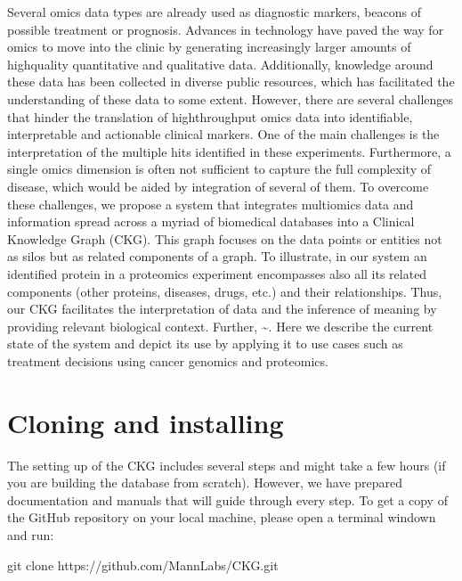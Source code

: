 \documentclass[letterpaper,10pt,english]{sphinxmanual}
\begin{document}
Several omics data types are already used as diagnostic markers, beacons of possible treatment or prognosis. Advances in technology have paved the way for omics to move into the clinic by generating increasingly larger amounts of high\sphinxhyphen{}quality quantitative and qualitative data.  Additionally, knowledge around these data has been collected in diverse public resources, which has facilitated the understanding of these data to some extent. However, there are several challenges that hinder the translation of high\sphinxhyphen{}throughput omics data into identifiable, interpretable and actionable clinical markers. One of the main challenges is the interpretation of the multiple hits identified in these experiments. Furthermore, a single omics dimension is often not sufficient to capture the full complexity of disease, which would be aided by integration of several of them. To overcome these challenges, we propose a system that integrates multi\sphinxhyphen{}omics data and information spread across a myriad of biomedical databases into a Clinical Knowledge Graph (CKG).  This graph focuses on the data points or entities not as silos but as related components of a graph. To illustrate, in our system an identified protein in a proteomics experiment encompasses also all its related components (other proteins, diseases, drugs, etc.) and their relationships. Thus, our CKG facilitates the interpretation of data and the inference of meaning by providing relevant biological context. Further, \textasciitilde{}. Here we describe the current state of the system and depict its use by applying it to use cases such as treatment decisions using cancer genomics and proteomics.


\section{Cloning and installing}
\label{\detokenize{INTRO:cloning-and-installing}}
The setting up of the CKG includes several steps and might take a few hours (if you are building the database from scratch). However, we have prepared documentation and manuals that will guide through every step.
To get a copy of the GitHub repository on your local machine, please open a terminal windown and run:

\begin{sphinxVerbatim}[commandchars=\\\{\}]
\PYGZdl{} git clone https://github.com/MannLabs/CKG.git
\end{sphinxVerbatim}
\end{document}
